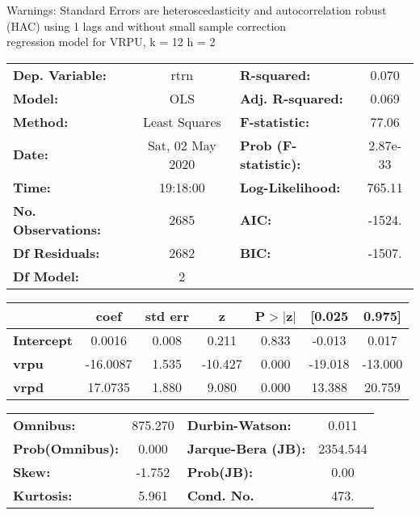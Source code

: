 Warnings: \newline
 [1] Standard Errors are heteroscedasticity and autocorrelation robust (HAC) using 1 lags and without small sample correction\\ 

regression model for VRPU, k = 12 h = 2\begin{center}
\begin{tabular}{lclc}
\toprule
\textbf{Dep. Variable:}    &       rtrn       & \textbf{  R-squared:         } &     0.070   \\
\textbf{Model:}            &       OLS        & \textbf{  Adj. R-squared:    } &     0.069   \\
\textbf{Method:}           &  Least Squares   & \textbf{  F-statistic:       } &     77.06   \\
\textbf{Date:}             & Sat, 02 May 2020 & \textbf{  Prob (F-statistic):} &  2.87e-33   \\
\textbf{Time:}             &     19:18:00     & \textbf{  Log-Likelihood:    } &    765.11   \\
\textbf{No. Observations:} &        2685      & \textbf{  AIC:               } &    -1524.   \\
\textbf{Df Residuals:}     &        2682      & \textbf{  BIC:               } &    -1507.   \\
\textbf{Df Model:}         &           2      & \textbf{                     } &             \\
\bottomrule
\end{tabular}
\begin{tabular}{lcccccc}
                   & \textbf{coef} & \textbf{std err} & \textbf{z} & \textbf{P$> |$z$|$} & \textbf{[0.025} & \textbf{0.975]}  \\
\midrule
\textbf{Intercept} &       0.0016  &        0.008     &     0.211  &         0.833        &       -0.013    &        0.017     \\
\textbf{vrpu}      &     -16.0087  &        1.535     &   -10.427  &         0.000        &      -19.018    &      -13.000     \\
\textbf{vrpd}      &      17.0735  &        1.880     &     9.080  &         0.000        &       13.388    &       20.759     \\
\bottomrule
\end{tabular}
\begin{tabular}{lclc}
\textbf{Omnibus:}       & 875.270 & \textbf{  Durbin-Watson:     } &    0.011  \\
\textbf{Prob(Omnibus):} &   0.000 & \textbf{  Jarque-Bera (JB):  } & 2354.544  \\
\textbf{Skew:}          &  -1.752 & \textbf{  Prob(JB):          } &     0.00  \\
\textbf{Kurtosis:}      &   5.961 & \textbf{  Cond. No.          } &     473.  \\
\bottomrule
\end{tabular}
\end{center}

